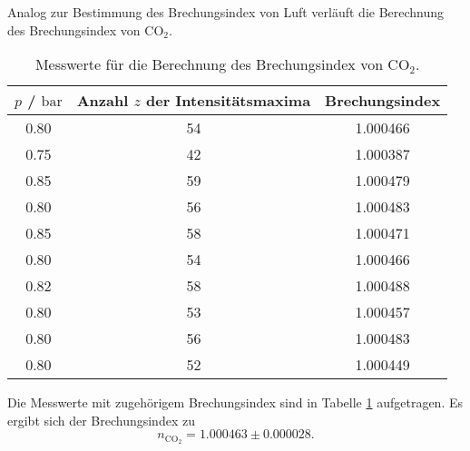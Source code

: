 Analog zur Bestimmung des Brechungsindex von Luft verläuft die Berechnung des
Brechungsindex von CO$_2$.

\begin{table}
	\caption{Messwerte für die Berechnung des Brechungsindex von \texorpdfstring{CO$_2$}{math}.}
	\label{tab:co2brech}
	\centering
	\begin{tabular}{ccc}
	\toprule
	$p$ / $\si{\bar}$ & Anzahl $z$ der Intensitätsmaxima & Brechungsindex \\
	\midrule
		0.80 & 54 & 1.000466 \\
		0.75 & 42 & 1.000387 \\
		0.85 & 59 & 1.000479 \\
		0.80 & 56 & 1.000483 \\
		0.85 & 58 & 1.000471 \\
		0.80 & 54 & 1.000466 \\
		0.82 & 58 & 1.000488 \\
		0.80 & 53 & 1.000457 \\
		0.80 & 56 & 1.000483 \\
		0.80 & 52 & 1.000449 \\
	\bottomrule
	\end{tabular}
\end{table}

Die Messwerte mit zugehörigem Brechungsindex sind in Tabelle \ref{tab:co2brech} aufgetragen.
Es ergibt sich der Brechungsindex zu
\begin{equation}
	n_{\mathrm{CO}_2} = 1.000463 \pm 0.000028 \mathrm{.}
\end{equation}
